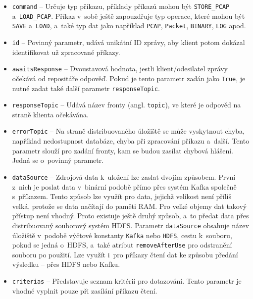 \begin{itemize}
    \item \texttt{command} -- Určuje typ příkazu, příklady příkazů mohou být \texttt{STORE\_PCAP} a~\texttt{LOAD\_PCAP}. Příkaz v~sobě ještě zapouzdřuje typ operace, které mohou být \texttt{SAVE} a~\texttt{LOAD}, a~také typ dat jako například \texttt{PCAP}, \texttt{Packet}, \texttt{BINARY}, \texttt{LOG} apod.
    
    \item \texttt{id} -- Povinný parametr, udává unikátní ID zprávy, aby klient potom dokázal identifikovat už zpracované příkazy.
    
    \item \texttt{awaitsResponse} -- Dvoustavová hodnota, jestli klient/odesilatel zprávy očekává od repositáře odpověď. Pokud je tento parametr zadán jako \texttt{True}, je nutné zadat také další parametr \texttt{responseTopic}.
    
    \item \texttt{responseTopic} -- Udává název fronty (angl. \texttt{topic}), ve které je odpověď na straně klienta očekávána.
    
    \item \texttt{errorTopic} -- Na straně distribuovaného úložiště se může vyskytnout chyba, například nedostupnost databáze, chyba při zpracování příkazu a~další. Tento parametr slouží pro zadání fronty, kam se budou zasílat chybová hlášení. Jedná se o~povinný parametr.
    
    \item \texttt{dataSource} -- Zdrojová data k~uložení lze zaslat dvojím způsobem. První z~nich je poslat data v~binární podobě přímo přes systém Kafka společně s~příkazem. Tento způsob lze využít pro data, jejichž velikost není příliš velká, protože se data načítají do paměti RAM. Pro velké objemy dat takový přístup není vhodný. Proto existuje ještě druhý způsob, a~to předat data přes distribuovaný souborový systém HDFS. Parametr \texttt{dataSource} obsahuje název úložiště v~podobě výčtové konstanty \texttt{Kafka} nebo \texttt{HDFS}, cestu k~souboru, pokud se jedná o~HDFS, a~také atribut \texttt{removeAfterUse} pro odstranění souboru po použití. Lze využít i~pro příkazy čtení dat ke způsobu předání výsledku -- přes HDFS nebo Kafku.
    
    \item \texttt{criterias} -- Představuje seznam kritérií pro dotazování. Tento parametr je vhodné vyplnit pouze při zasílání příkazu čtení.
\end{itemize}

